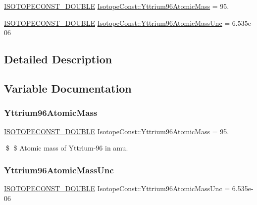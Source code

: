 \begin{DoxyCompactItemize}
\item 
\mbox{\hyperlink{group___isotope_const-_macros_ga8f45a7272ce02c0b4c65c44636ed719a}{I\+S\+O\+T\+O\+P\+E\+C\+O\+N\+S\+T\+\_\+\+D\+O\+U\+B\+LE}} \mbox{\hyperlink{group___isotope_const-_yttrium-_y96_ga2652378973ca4e39e0daea1490897703}{Isotope\+Const\+::\+Yttrium96\+Atomic\+Mass}} = 95.
\item 
\mbox{\hyperlink{group___isotope_const-_macros_ga8f45a7272ce02c0b4c65c44636ed719a}{I\+S\+O\+T\+O\+P\+E\+C\+O\+N\+S\+T\+\_\+\+D\+O\+U\+B\+LE}} \mbox{\hyperlink{group___isotope_const-_yttrium-_y96_gaf2541c44111be431e73aee4b92b0bcfa}{Isotope\+Const\+::\+Yttrium96\+Atomic\+Mass\+Unc}} = 6.\+535e-\/06
\end{DoxyCompactItemize}


\subsection{Detailed Description}


\subsection{Variable Documentation}
\mbox{\label{group___isotope_const-_yttrium-_y96_ga2652378973ca4e39e0daea1490897703}} 
\subsubsection{\texorpdfstring{Yttrium96\+Atomic\+Mass}{Yttrium96AtomicMass}}
{\footnotesize\ttfamily \mbox{\hyperlink{group___isotope_const-_macros_ga8f45a7272ce02c0b4c65c44636ed719a}{I\+S\+O\+T\+O\+P\+E\+C\+O\+N\+S\+T\+\_\+\+D\+O\+U\+B\+LE}} Isotope\+Const\+::\+Yttrium96\+Atomic\+Mass = 95.}

\$ \$ Atomic mass of Yttrium-\/96 in amu. \mbox{\label{group___isotope_const-_yttrium-_y96_gaf2541c44111be431e73aee4b92b0bcfa}} 
\subsubsection{\texorpdfstring{Yttrium96\+Atomic\+Mass\+Unc}{Yttrium96AtomicMassUnc}}
{\footnotesize\ttfamily \mbox{\hyperlink{group___isotope_const-_macros_ga8f45a7272ce02c0b4c65c44636ed719a}{I\+S\+O\+T\+O\+P\+E\+C\+O\+N\+S\+T\+\_\+\+D\+O\+U\+B\+LE}} Isotope\+Const\+::\+Yttrium96\+Atomic\+Mass\+Unc = 6.\+535e-\/06}

